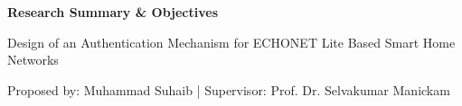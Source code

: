 \documentclass[11pt,a4paper]{article}
\begin{document}
\begin{tcolorbox}[
    enhanced,
    colback=techblue,
    coltext=white,
    halign=center,
    valign=center,
    boxrule=0pt,
    arc=0pt,
    grow to left by=15mm,
    grow to right by=15mm,
    top=25mm,
    bottom=10mm,
    after skip=20pt
]
    {\huge\bfseries Research Summary \& Objectives\par}
    \vspace{6pt}
    {\large Design of an Authentication Mechanism for ECHONET Lite Based Smart Home Networks\par}
    \vspace{12pt}
    {\small Proposed by: Muhammad Suhaib | Supervisor: Prof. Dr. Selvakumar Manickam\par}
\end{tcolorbox}
\end{document}
